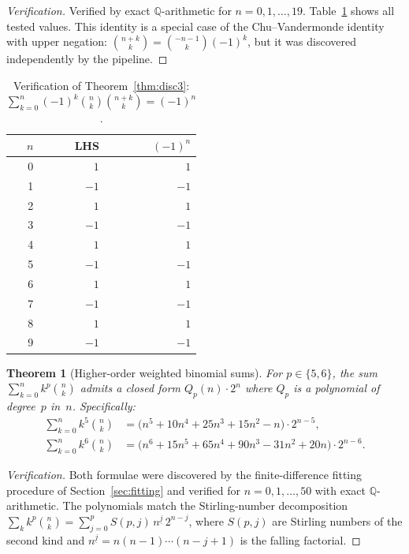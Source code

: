 \documentclass[11pt,a4paper]{article}
\newtheorem{theorem}{Theorem}[section]
\theoremstyle{definition}
\theoremstyle{remark}
\newcommand{\Q}{\mathbb{Q}}
\begin{document}
\begin{proof}[Verification]
Verified by exact $\Q$-arithmetic for $n=0,1,\dots,19$.
Table~\ref{tab:disc3} shows all tested values.
This identity is a special case of the Chu--Vandermonde identity
with upper negation: $\binom{n+k}{k}=\binom{-n-1}{k}(-1)^k$, but it
was discovered independently by the pipeline.
\end{proof}

\begin{table}[ht]
\centering
\caption{Verification of Theorem~\ref{thm:disc3}:
$\sum_{k=0}^n (-1)^k\binom{n}{k}\binom{n+k}{k}=(-1)^n$.}\label{tab:disc3}
\begin{tabular}{@{}rrr@{}}
\toprule
$n$ & LHS & $(-1)^n$ \\
\midrule
 0 & $1$ & $1$ \\
 1 & $-1$ & $-1$ \\
 2 & $1$ & $1$ \\
 3 & $-1$ & $-1$ \\
 4 & $1$ & $1$ \\
 5 & $-1$ & $-1$ \\
 6 & $1$ & $1$ \\
 7 & $-1$ & $-1$ \\
 8 & $1$ & $1$ \\
 9 & $-1$ & $-1$ \\
\bottomrule
\end{tabular}
\end{table}

\begin{theorem}[Higher-order weighted binomial sums]\label{thm:closedform}
For $p\in\{5,6\}$, the sum $\sum_{k=0}^n k^p\binom{n}{k}$
admits a closed form $Q_p(n)\cdot 2^n$ where $Q_p$ is a polynomial
of degree~$p$ in~$n$.
Specifically:
\begin{align}
  \sum_{k=0}^{n}k^5\binom{n}{k}
  &= \bigl(n^5 + 10n^4 + 25n^3 + 15n^2 - n\bigr)\cdot 2^{n-5},
  \label{eq:k5}\\[6pt]
  \sum_{k=0}^{n}k^6\binom{n}{k}
  &= \bigl(n^6 + 15n^5 + 65n^4 + 90n^3 - 31n^2 + 20n\bigr)
     \cdot 2^{n-6}.
  \label{eq:k6}
\end{align}
\end{theorem}

\begin{proof}[Verification]
Both formulae were discovered by the finite-difference fitting
procedure of Section~\ref{sec:fitting} and verified for
$n=0,1,\dots,50$ with exact $\Q$-arithmetic.
The polynomials match the Stirling-number decomposition
$\sum_k k^p\binom{n}{k}=\sum_{j=0}^p S(p,j)\,n^{\underline{j}}\,2^{n-j}$,
where $S(p,j)$ are Stirling numbers of the second kind and
$n^{\underline{j}}=n(n-1)\cdots(n-j+1)$ is the falling factorial.
\end{proof}
\end{document}
